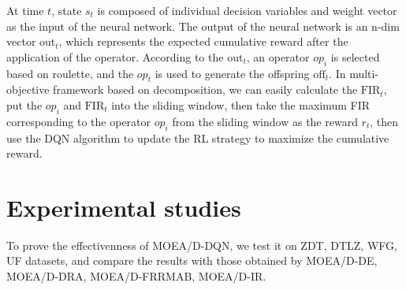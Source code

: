 \documentclass[journal]{IEEEtran}
\newcommand{\TODO}[1]{\textcolor[rgb]{1.00,0.40,0.22}{#1}}
\begin{document}
At time $t$, state $s_t$ is composed of individual decision variables and weight vector as the input of the neural network. The output of the neural network is an n-dim vector $\text{out}_t$, which represents the expected cumulative reward after the application of the operator.
According to the $\text{out}_t$, an operator $op_i$ is selected based on roulette, and the $op_t$ is used to generate the offspring $\text{off}_t$. In multi-objective framework based on decomposition, we can easily calculate the $\text{FIR}_t$, put the $op_i$ and $\text{FIR}_t$ into the sliding window, then take the maximum FIR corresponding to the operator $op_i$ from the sliding window as the reward $r_t$, then use the DQN algorithm to update the RL strategy to maximize the cumulative reward.



\section{Experimental studies}
To prove the effectivenness of MOEA/D-DQN, we test it on ZDT, DTLZ, WFG, UF datasets, and compare the results with those obtained by MOEA/D-DE, MOEA/D-DRA, MOEA/D-FRRMAB, MOEA/D-IR.
\end{document}
